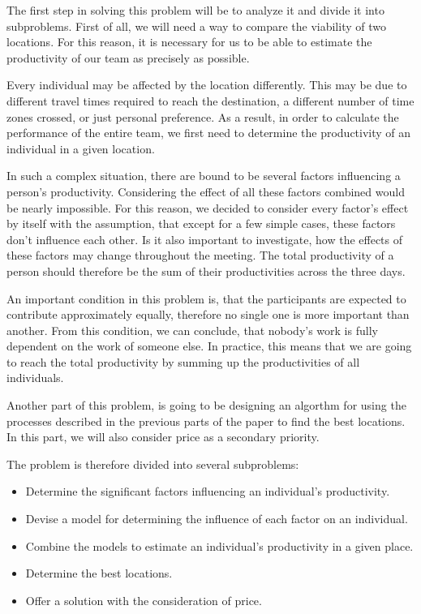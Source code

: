 
The first step in solving this problem will be to analyze it and divide it into subproblems. First of all, we will need a way to compare the viability of two locations. For this reason, it is necessary for us to be able to estimate the productivity of our team as precisely as possible.

Every individual may be affected by the location differently. This may be due to different travel times required to reach the destination, a different number of time zones crossed, or just personal preference. As a result, in order to calculate the performance of the entire team, we first need to determine the productivity of an individual in a given location. 

In such a complex situation, there are bound to be several factors influencing a person's productivity. Considering the effect of all these factors combined would be nearly impossible. For this reason, we decided to consider every factor's effect by itself with the assumption, that except for a few simple cases, these factors don't influence each other. Is it also important to investigate, how the effects of these factors may change throughout the meeting. The total productivity of a person should therefore be the sum of their productivities across the three days. 

An important condition in this problem is, that the participants are expected to contribute approximately equally, therefore no single one is more important than another. From this condition, we can conclude, that nobody's work is fully dependent on the work of someone else. In practice, this means that we are going to reach the total productivity by summing up the productivities of all individuals. 

Another part of this problem, is going to be designing an algorthm for using the processes described in the previous parts of the paper to find the best locations. In this part, we will also consider price as a secondary priority.

The problem is therefore divided into several subproblems:
\begin{itemize}[noitemsep,topsep=0pt,parsep=0pt,partopsep=0pt]
\item Determine the significant factors influencing an individual's  productivity.
\item Devise a model for determining the influence of each factor on an individual.
\item Combine the models to estimate an individual's productivity in a given place.
\item Determine the best locations.
\item Offer a solution with the consideration of price.
\end{itemize}